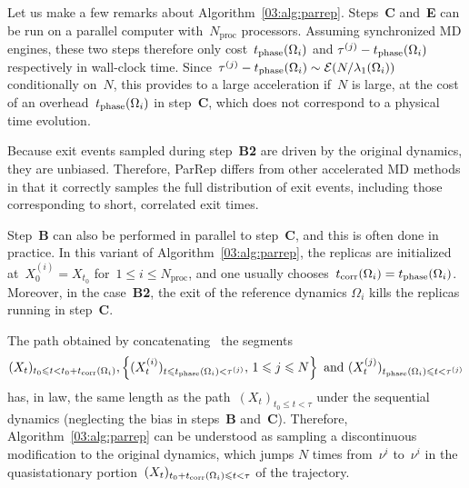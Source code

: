     Let us make a few remarks about Algorithm~\ref{03:alg:parrep}. Steps~{\bf{C}} and~{\bf{E}} can be run on a parallel computer with~$N_{\mathrm{proc}}$ processors. Assuming synchronized MD engines, these two steps therefore only cost~$t_{\operatorname{phase}}(\Omega_i)$ and $\tau^{(j)}-t_{\operatorname{phase}}(\Omega_i)$ respectively in wall-clock time. Since~$\tau^{(j)}-t_{\operatorname{phase}}(\Omega_i)\sim\mathcal E(N/\lambda_1(\Omega_i))$ conditionally on~$N$, this provides to a large acceleration if~$N$ is large, at the cost of an overhead~$t_{\operatorname{phase}}(\Omega_i)$ in step~{\bf{C}}, which does not correspond to a physical time evolution. 

    Because exit events sampled during step~{\bf{B2}} are driven by the original dynamics, they are unbiased. Therefore, ParRep differs from other accelerated MD methods in that it correctly samples the full distribution of exit events, including those corresponding to short, correlated exit times.
    
    Step~{\bf{B}} can also be performed in parallel to step~{\bf{C}}, and this is often done in practice. In this variant of Algorithm~\ref{03:alg:parrep}, the replicas are initialized at~$X_0^{(i)}=X_{t_0}$ for~$1\leq i\leq N_{\mathrm{proc}}$, and one usually chooses~$t_{\operatorname{corr}}(\Omega_i)=t_{\operatorname{phase}}(\Omega_i)$. Moreover, in the case~{\bf{B2}}, the exit of the reference dynamics $\Omega_i$ kills the replicas running in step~{\bf{C}}.
    
    The path obtained by concatenating~ the segments
    $$(X_t)_{t_0\leqslant t< t_0+t_{\operatorname{corr}}(\Omega_i)},\left\{(X_t^{(i)})_{t\leqslant t_{\operatorname{phase}}(\Omega_i)<\tau^{(j)}},\,1\leqslant j \leqslant N\right\}\text{ and }(X_t^{(j)})_{t_{\operatorname{phase}}(\Omega_i)\leqslant t<\tau^{(j)}}$$
    has, in law, the same length as the path~$(X_t)_{t_0\leq t < \tau}$ under the sequential dynamics (neglecting the bias in steps~{\bf{B}} and~{\bf{C}}). Therefore, Algorithm~\ref{03:alg:parrep} can be understood as sampling a discontinuous modification to the original dynamics, which jumps $N$ times from~$\nu^i$ to~$\nu^i$ in the quasistationary portion~$(X_t)_{t_0+t_{\operatorname{corr}}(\Omega_i)\leqslant t < \tau}$ of the trajectory.
    
